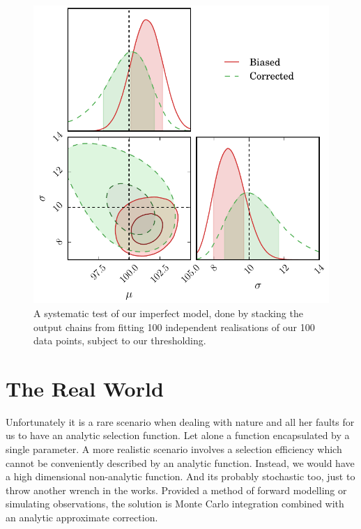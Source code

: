 \documentclass[a4paper,fleqn,usenatbib]{mnras}
\begin{document}
\begin{figure}
	\begin{center}
		\includegraphics[width=\columnwidth]{example/imperfect.pdf}
	\end{center}
	\caption{A systematic test of our imperfect model, done by stacking the output chains from fitting 100 independent realisations of our 100 data points, subject to our thresholding.}
	\label{fig:imperfect}
\end{figure}

\section{The Real World}
\label{sec:real}
Unfortunately it is a rare scenario when dealing with nature and all her faults for us to have an analytic selection function. Let alone a function encapsulated by a single parameter. A more realistic scenario involves a selection efficiency which cannot be conveniently described by an analytic function. Instead, we would have a high dimensional non-analytic function. And its probably stochastic too, just to throw another wrench in the works. Provided a method of forward modelling or simulating observations, the solution is Monte Carlo integration combined with an analytic approximate correction.
\end{document}
